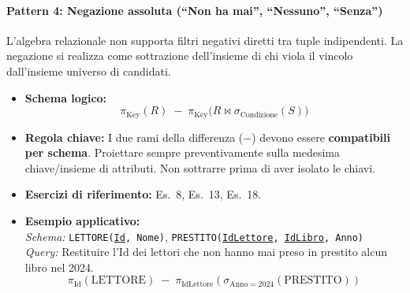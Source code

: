 \documentclass[12pt]{extarticle}
\begin{document}
\paragraph{Pattern 4: Negazione assoluta (``Non ha mai'', ``Nessuno'', ``Senza'')}
L'algebra relazionale non supporta filtri negativi diretti tra tuple indipendenti. La negazione si realizza come sottrazione dell'insieme di chi viola il vincolo dall'insieme universo di candidati.
\begin{itemize}
    \item \textbf{Schema logico:}
    \[
    \pi_{\text{Key}}(R) \;-\; \pi_{\text{Key}}\big( R \bowtie \sigma_{\text{Condizione}}(S) \big)
    \]
    \item \textbf{Regola chiave:} I due rami della differenza ($-$) devono essere \textbf{compatibili per schema}. Proiettare sempre preventivamente sulla medesima chiave/insieme di attributi. Non sottrarre prima di aver isolato le chiavi.
    \item \textbf{Esercizi di riferimento:} Es.~8, Es.~13, Es.~18.
    \item \textbf{Esempio applicativo:}\\
    \textit{Schema:} \texttt{LETTORE(\underline{Id}, Nome)}, \texttt{PRESTITO(\underline{IdLettore}, \underline{IdLibro}, Anno)}\\
    \textit{Query:} Restituire l'Id dei lettori che non hanno mai preso in prestito alcun libro nel 2024.
    \[
    \pi_{\text{Id}}(\text{LETTORE}) \;-\; \pi_{\text{IdLettore}}(\sigma_{\text{Anno} = 2024}(\text{PRESTITO}))
    \]
\end{itemize}

\end{document}
